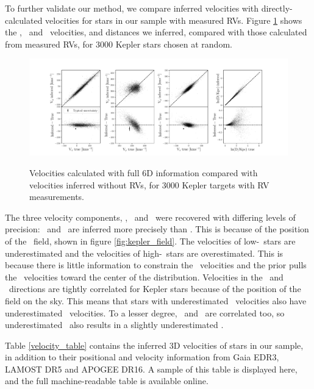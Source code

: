 To further validate our method, we compare inferred velocities with
directly-calculated velocities for stars in our sample with measured RVs.
Figure \ref{fig:residuals} shows the \vx, \vy\ and \vz\ velocities, and
distances we inferred, compared with those calculated from measured RVs, for
3000 Kepler stars chosen at random.
\begin{figure}[ht!]
\caption{Velocities calculated with full 6D information compared with
    velocities inferred without RVs, for 3000 Kepler targets with RV
    measurements.}
  \centering
    \includegraphics[width=1\textwidth]{residuals}
\label{fig:residuals}
\end{figure}

The three velocity components, \vx, \vy\ and \vz\ were recovered with
differing levels of precision: \vx\ and \vz\ are inferred more precisely than
\vy.
This is because of the position of the \kepler\ field, shown in figure
\ref{fig:kepler_field}.
The velocities of low-\vy\ stars are underestimated and the velocities of
high-\vy\ stars are overestimated.
This is because there is little information to constrain the \vy\ velocities
and the prior pulls the \vy\ velocities toward the center of the distribution.
Velocities in the \y\ and \z\ directions are tightly correlated for Kepler
stars because of the position of the field on the sky.
This means that stars with underestimated \vy\ velocities also have
underestimated \vz\ velocities.
To a lesser degree, \vy\ and \vx\ are correlated too, so underestimated \vy\
also results in a slightly underestimated \vx.

Table \ref{velocity_table} contains the inferred 3D velocities of stars in our
sample, in addition to their positional and velocity information from
Gaia EDR3, LAMOST DR5 and APOGEE DR16.
A sample of this table is displayed here, and the full machine-readable table
is available online.

